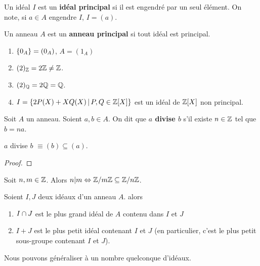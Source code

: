 \begin{definition} 
	\label{def:principal_ideal}
	Un idéal $I$ est un \textbf{idéal principal} si il est engendré par un seul
	élément. On note, si $a \in A$ engendre $I$, $I = (a)$.
\end{definition}

\begin{definition} 
	Un anneau $A$ est un \textbf{anneau principal} si tout idéal est principal.
	\label{principal_ring}
\end{definition}

\begin{exemple}
	\begin{enumerate}
		\item $\left\{ 0_{A} \right\} = (0_{A})$, $A = (1_{A})$
		\item $(2)_{\mathbb{Z}} = 2\mathbb{Z} \neq \mathbb{Z}$.
		\item $(2)_{\mathbb{Q}} = 2\mathbb{Q} = \mathbb{Q}$.
		\item $I = \left\{2 P(X) + X Q(X) \, | \, P, Q \in \mathbb{Z}[X] \right\}$ est un
			idéal de $\mathbb{Z}[X]$ non principal.
	\end{enumerate}
\end{exemple}

\begin{definition}
	Soit $A$ un anneau. Soient $a, b \in A$. On dit que \textbf{$a$ divise $b$}
	s'il existe $n \in \mathbb{Z}$ tel que $b = na$.
\end{definition}

\begin{proposition}
	$a$ divise $b$ $\equiv (b) \subseteq (a)$.
\end{proposition}

\ifdefined\outputproof
\begin{proof}

\end{proof}
\fi

\begin{exemple}
	Soit $n, m \in \mathbb{Z}$. Alors $n | m \Leftrightarrow \mathbb{Z}/m\mathbb{Z} \subseteq
	\mathbb{Z}/n\mathbb{Z}$.
\end{exemple}

\begin{proposition}
	Soient $I, J$ deux idéaux d'un anneau $A$. alors

	\begin{enumerate}
		\item $I \cap J$ est le plus grand idéal de $A$ contenu dans $I$ et $J$
		\item $I + J$ est le plus petit idéal contenant $I$ et $J$ (en
			particulier, c'est le plus petit sous-groupe contenant $I$ et $J$).
	\end{enumerate}
	Nous pouvons généraliser à un nombre quelconque d'idéaux.
\end{proposition}

